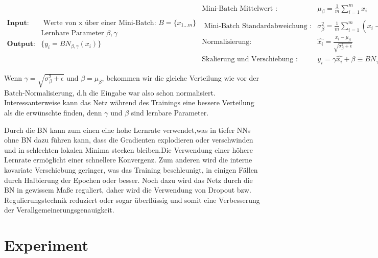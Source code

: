 \documentclass[12pt,a4paper]{scrartcl}
\numberwithin{equation}{section}
\begin{document}
\begin{subequations}
	 \begin{align*}
		\textbf{Input:} & \text{  Werte von x über einer Mini-Batch: } B=\{x_{1...m}\}\\
		& \text{Lernbare Parameter  } \beta, \gamma \\
		\textbf{Output:} & \{ y_i = BN_{\beta, \gamma}(x_i)\}
	\end{align*}
	\begin{align}
		\text{Mini-Batch Mittelwert  : } &\mu_\beta=\frac{1}{m}\sum_{i = 1}^{m}x_i \\
		\text{ Mini-Batch Standardabweichung :} &\sigma_\beta^2=\frac{1}{m}\sum_{i = 1}^{m}(x_i- \mu_\beta)^2 \\
		 \text{Normalisierung:} & \widehat{x_i} = \frac{x_i - \mu_\beta}{\sqrt{\sigma_\beta^2 + \epsilon}} \\
		 \text{Skalierung und Verschiebung :} & {y_i} = \gamma\widehat{x_i} + \beta \equiv BN_{\gamma, \beta}
	\end{align}
	\label{BNA}
\end{subequations}

Wenn $\gamma = \sqrt{\sigma_\beta^2 + \epsilon}$ und $\beta = \mu_\beta $, bekommen wir die gleiche Verteilung wie vor der Batch-Normalisierung, d.h die Eingabe war also schon normalisiert. Interessanterweise kann das Netz während des Trainings eine bessere Verteilung als die erwünschte finden, denn $\gamma$ und $\beta$ sind lernbare Parameter.

 Durch die BN kann zum einen eine hohe Lernrate verwendet,was in tiefer \acsp{NN} ohne BN dazu führen kann, dass die Gradienten explodieren oder verschwinden und in schlechten lokalen Minima stecken bleiben.Die Verwendung einer höhere Lernrate ermöglicht einer schnellere Konvergenz.
 Zum anderen wird die interne kovariate Verschiebung geringer, was das Training beschleunigt, in einigen Fällen durch Halbierung der Epochen oder besser. Noch dazu wird das Netz durch die BN in gewissem Maße reguliert, daher wird die Verwendung von Dropout bzw. Regulierungstechnik reduziert oder sogar überflüssig und somit eine Verbesserung der Verallgemeinerungsgenauigkeit.



\section{Experiment}
\end{document}
